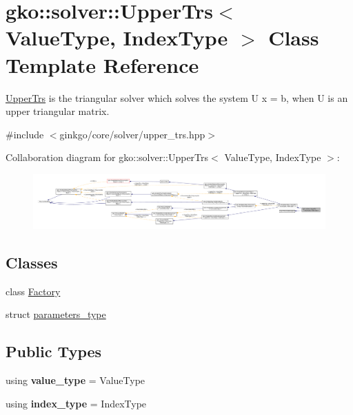 \hypertarget{classgko_1_1solver_1_1UpperTrs}{}\section{gko\+:\+:solver\+:\+:Upper\+Trs$<$ Value\+Type, Index\+Type $>$ Class Template Reference}
\label{classgko_1_1solver_1_1UpperTrs}


\hyperlink{classgko_1_1solver_1_1UpperTrs}{Upper\+Trs} is the triangular solver which solves the system U x = b, when U is an upper triangular matrix.  




{\ttfamily \#include $<$ginkgo/core/solver/upper\+\_\+trs.\+hpp$>$}



Collaboration diagram for gko\+:\+:solver\+:\+:Upper\+Trs$<$ Value\+Type, Index\+Type $>$\+:
\nopagebreak
\begin{figure}[H]
\begin{center}
\leavevmode
\includegraphics[width=350pt]{classgko_1_1solver_1_1UpperTrs__coll__graph}
\end{center}
\end{figure}
\subsection*{Classes}
\begin{DoxyCompactItemize}
\item 
class \hyperlink{classgko_1_1solver_1_1UpperTrs_1_1Factory}{Factory}
\item 
struct \hyperlink{structgko_1_1solver_1_1UpperTrs_1_1parameters__type}{parameters\+\_\+type}
\end{DoxyCompactItemize}
\subsection*{Public Types}
\begin{DoxyCompactItemize}
\item 
\mbox{\label{classgko_1_1solver_1_1UpperTrs_a30d7665c4a4694017ce3bf425069db5a}} 
using {\bfseries value\+\_\+type} = Value\+Type
\item 
\mbox{\label{classgko_1_1solver_1_1UpperTrs_a361cb1c89c8f6cba2201344467d9edee}} 
using {\bfseries index\+\_\+type} = Index\+Type
\end{DoxyCompactItemize}
